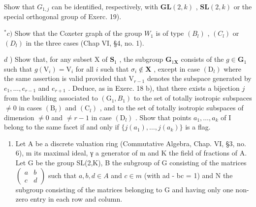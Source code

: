 Show that \(G_{1,j}\) can be identified, respectively, with \(\mathbf{GL}(2,k)\) , \(\mathbf{SL}(2,k)\) or the special orthogonal group of Exerc. 19).

\(^{*}c)\) Show that the Coxeter graph of the group \(W_{1}\) is of type \((B_{l})\) , \((C_{l})\) or \((D_{l})\) in the three cases (Chap VI, §4, no. 1).

\(d\) ) Show that, for any subset X of \(\mathbf{S}_1\) , the subgroup \(\mathbf{G}_{1\mathbf{X}}\) consists of the \(g\in \mathbf{G}_1\) such that \(g(\mathrm{V}_i) = \mathrm{V}_i\) for all \(i\) such that \(\sigma_{i}\notin \mathbf{X}\) , except in case \((\mathrm{D}_l)\) where the same assertion is valid provided that \(\mathrm{V}_{r - 1}\) denotes the subspace generated by \(e_1,\dots ,e_{r - 1}\) and \(e_{r + 1}\) . Deduce, as in Exerc. 18 b), that there exists a bijection \(j\) from the building associated to \((\mathrm{G}_1,B_1)\) to the set of totally isotropic subspaces \(\neq 0\) in cases \((\mathrm{B}_l)\) and \((\mathrm{C}_l)\) , and to the set of totally isotropic subspaces of dimension \(\neq 0\) and \(\neq r - 1\) in case \((\mathrm{D}_l)\) . Show that points \(a_1,\ldots ,a_k\) of I belong to the same facet if and only if \(\{j(a_1),\dots ,j(a_k)\}\) is a flag.

\begin{enumerate}
\def\labelenumi{\arabic{enumi})}
\setcounter{enumi}{20}
\tightlist
\item
  Let A be a discrete valuation ring (Commutative Algebra, Chap. VI, §3, no. 6), m its maximal ideal, γ a generator of m and K the field of fractions of A. Let G be the group SL(2,K), B the subgroup of G consisting of the matrices \(\begin{pmatrix} a & b \\ c & d \end{pmatrix}\) such that \(a, b, d \in A\) and \(c \in m\) (with ad - bc = 1) and N the subgroup consisting of the matrices belonging to G and having only one non-zero entry in each row and column.
\end{enumerate}

